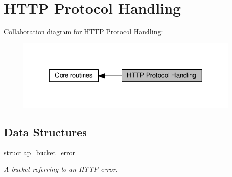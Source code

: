 \hypertarget{group__APACHE__CORE__PROTO}{}\section{H\+T\+TP Protocol Handling}
\label{group__APACHE__CORE__PROTO}
Collaboration diagram for H\+T\+TP Protocol Handling\+:
\nopagebreak
\begin{figure}[H]
\begin{center}
\leavevmode
\includegraphics[width=314pt]{group__APACHE__CORE__PROTO}
\end{center}
\end{figure}
\subsection*{Data Structures}
\begin{DoxyCompactItemize}
\item 
struct \hyperlink{structap__bucket__error}{ap\+\_\+bucket\+\_\+error}
\begin{DoxyCompactList}\small\item\em A bucket referring to an H\+T\+TP error. \end{DoxyCompactList}\end{DoxyCompactItemize}
